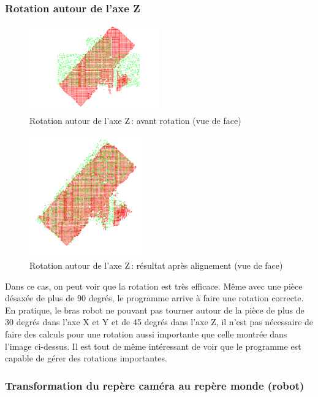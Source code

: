 \clearpage

\subsubsection{Rotation autour de l'axe Z}

\begin{figure}[H]
    \centering
    \includegraphics[width=0.50\textwidth]{assets/figures/rot_z_avt.png}
    \caption{Rotation autour de l’axe Z : avant rotation (vue de face)}
    \label{fig:rot_z_avt}
\end{figure}
\begin{figure}[H]
    \centering
    \includegraphics[width=0.45\textwidth]{assets/figures/rot_z_aprs.png}
    \caption{Rotation autour de l’axe Z : résultat après alignement (vue de face)}
    \label{fig:rot_z_aprs}
\end{figure}
Dans ce cas, on peut voir que la rotation est très efficace. Même avec une pièce désaxée de plus de 90 degrés, le programme arrive à faire une rotation correcte. En pratique, le bras robot ne pouvant pas tourner autour de la pièce de plus de 30 degrés dans l'axe X et Y et de 45 degrés dans l'axe Z, il n'est pas nécessaire de faire des calculs pour une rotation aussi importante que celle montrée dans l'image ci-dessus. Il est tout de même intéressant de voir que le programme est capable de gérer des rotations importantes.
\subsubsection{Transformation du repère caméra au repère monde (robot)}

